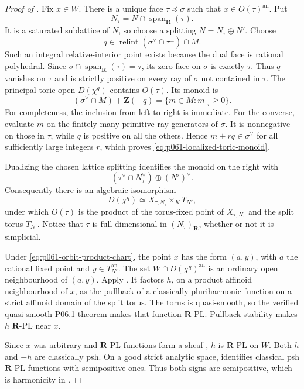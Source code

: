 \begin{proof}[Proof of ]
Fix \(x\in W\).  There is a unique face
\(\tau\preceq\sigma\) such that \(x\in O(\tau)^{\mathrm{an}}\).  Put
\[
 N_\tau=N\cap\operatorname{span}_{\mathbf R}(\tau).
\]
It is a saturated sublattice of \(N\), so choose a splitting
\(N=N_\tau\oplus N'\).  Choose
\[
 q\in\operatorname{relint}
 (\sigma^\vee\cap\tau^\perp)\cap M.
\]
Such an integral relative-interior point exists because the dual face is
rational polyhedral.  Since
\(\sigma\cap\operatorname{span}_{\mathbf R}(\tau)=\tau\), its zero face
on \(\sigma\) is exactly \(\tau\).  Thus \(q\) vanishes on \(\tau\) and
is strictly positive on every ray of \(\sigma\) not contained in
\(\tau\).  The principal toric open
\(D(\chi^q)\) contains \(O(\tau)\).  Its monoid is
\begin{equation}
\label{eq:p061-localized-toric-monoid}
 (\sigma^\vee\cap M)+\mathbf Z(-q)
   =\{m\in M: m|_\tau\geq0\}.
\end{equation}
For completeness, the inclusion from left to right is immediate.  For
the converse, evaluate \(m\) on the finitely many primitive ray
generators of \(\sigma\).  It is nonnegative on those in \(\tau\), while
\(q\) is positive on all the others.  Hence \(m+r q\in\sigma^\vee\) for
all sufficiently large integers \(r\), which proves
\eqref{eq:p061-localized-toric-monoid}.

Dualizing the chosen lattice splitting identifies the monoid on the
right with
\[
 (\tau^\vee\cap N_\tau^\vee)\oplus (N')^\vee.
\]
Consequently there is an algebraic isomorphism
\begin{equation}
\label{eq:p061-orbit-product-chart}
 D(\chi^q)\simeq
 X_{\tau,N_\tau}\times_K T_{N'},
\end{equation}
under which \(O(\tau)\) is the product of the torus-fixed point of
\(X_{\tau,N_\tau}\) and the split torus \(T_{N'}\).  Notice that
\(\tau\) is full-dimensional in \((N_\tau)_{\mathbf R}\), whether or not
it is simplicial.

Under \eqref{eq:p061-orbit-product-chart}, the point \(x\) has the form
\((a,y)\), with \(a\) the rational fixed point and
\(y\in T_{N'}^{\mathrm{an}}\).  The set
\(W\cap D(\chi^q)^{\mathrm{an}}\) is an ordinary open neighbourhood of
\((a,y)\).  Apply
.  It factors \(h\), on
a product affinoid neighbourhood of \(x\), as the pullback of a
classically pluriharmonic function on a strict affinoid domain of the
split torus.  The torus is quasi-smooth, so the verified quasi-smooth
P06.1 theorem makes that function \(\mathbf R\)-PL.  Pullback stability
\cite[Lemma~5.4(1)]{GJR26} makes \(h\) \(\mathbf R\)-PL near \(x\).

Since \(x\) was arbitrary and \(\mathbf R\)-PL functions form a sheaf
\cite[\S5.2(4)]{GJR26}, \(h\) is \(\mathbf R\)-PL on \(W\).  Both \(h\)
and \(-h\) are classically psh.  On a good strict analytic space,
\cite[Theorem~4.3]{GR25Classical} identifies classical psh
\(\mathbf R\)-PL functions with semipositive ones.  Thus both signs are
semipositive, which is harmonicity in
\cite[Definition~7.2]{GJR26}.
\end{proof}

